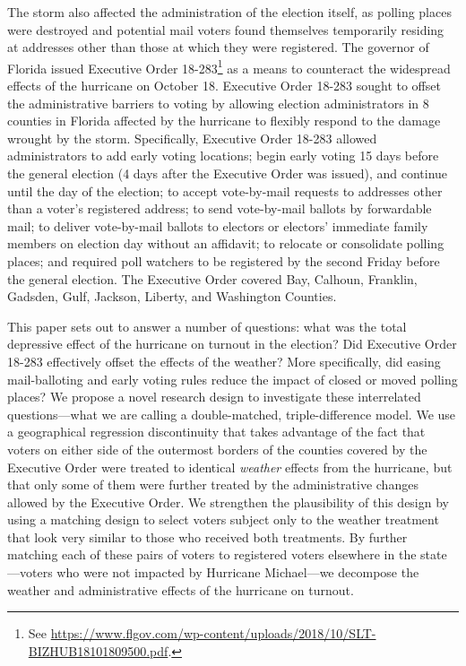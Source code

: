 \documentclass[
  12pt,
]{article}
\begin{document}
The storm also affected the administration of the election itself, as polling places were destroyed and potential mail voters found themselves temporarily residing at addresses other than those at which they were registered. The governor of Florida issued Executive Order 18-283\footnote{See \url{https://www.flgov.com/wp-content/uploads/2018/10/SLT-BIZHUB18101809500.pdf}.} as a means to counteract the widespread effects of the hurricane on October 18. Executive Order 18-283 sought to offset the administrative barriers to voting by allowing election administrators in 8 counties in Florida affected by the hurricane to flexibly respond to the damage wrought by the storm. Specifically, Executive Order 18-283 allowed administrators to add early voting locations; begin early voting 15 days before the general election (4 days after the Executive Order was issued), and continue until the day of the election; to accept vote-by-mail requests to addresses other than a voter's registered address; to send vote-by-mail ballots by forwardable mail; to deliver vote-by-mail ballots to electors or electors' immediate family members on election day without an affidavit; to relocate or consolidate polling places; and required poll watchers to be registered by the second Friday before the general election. The Executive Order covered Bay, Calhoun, Franklin, Gadsden, Gulf, Jackson, Liberty, and Washington Counties.

This paper sets out to answer a number of questions: what was the total depressive effect of the hurricane on turnout in the election? Did Executive Order 18-283 effectively offset the effects of the weather? More specifically, did easing mail-balloting and early voting rules reduce the impact of closed or moved polling places? We propose a novel research design to investigate these interrelated questions---what we are calling a double-matched, triple-difference model. We use a geographical regression discontinuity that takes advantage of the fact that voters on either side of the outermost borders of the counties covered by the Executive Order were treated to identical \emph{weather} effects from the hurricane, but that only some of them were further treated by the administrative changes allowed by the Executive Order. We strengthen the plausibility of this design by using a matching design to select voters subject only to the weather treatment that look very similar to those who received both treatments. By further matching each of these pairs of voters to registered voters elsewhere in the state---voters who were not impacted by Hurricane Michael---we decompose the weather and administrative effects of the hurricane on turnout.
\end{document}
